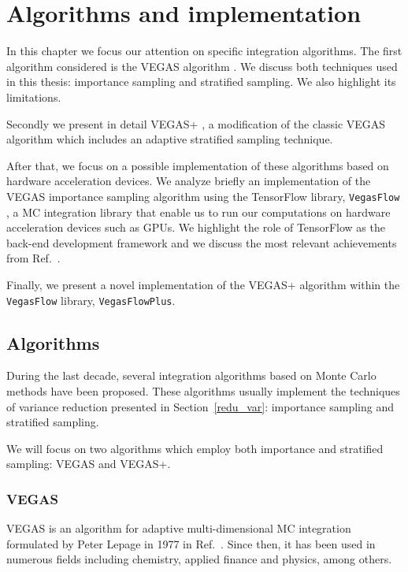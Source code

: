 \documentclass[../main/main.tex]{subfiles}
\begin{document}
\chapter[Algorithms and implementation]{Algorithms and implementation}
In this chapter we focus our attention on specific integration algorithms. 
The first algorithm considered is the VEGAS algorithm \cite{Lepage:1977sw}. We discuss both techniques used in this thesis: importance sampling and stratified sampling. We also highlight its limitations.

Secondly we present in detail VEGAS+ \cite{Lepage:2020tgj}, a modification of the classic VEGAS algorithm which includes an adaptive stratified sampling technique.

After that, we focus on a possible implementation of these algorithms based on hardware acceleration devices.
We analyze briefly an implementation of the VEGAS importance sampling algorithm using the TensorFlow library, \texttt{VegasFlow} \cite{vegasflow_package}, a MC integration library that enable us to run our computations on hardware acceleration devices such as GPUs. We highlight the role of TensorFlow as the back-end development framework and we discuss the most relevant achievements from Ref.~\cite{Carrazza:2020rdn}.

Finally, we present a novel implementation of the VEGAS+ algorithm within the \texttt{VegasFlow} library, \texttt{VegasFlowPlus}.

 
	
\section{Algorithms}
During the last decade, several integration algorithms based on Monte Carlo methods have been proposed.
These algorithms usually implement the techniques of variance reduction presented in Section~\ref{redu_var}: importance sampling and stratified sampling.

We will focus on two algorithms which employ both importance and stratified sampling: VEGAS and VEGAS+.

\subsection{VEGAS}
\label{vegas}
VEGAS is an algorithm for adaptive multi-dimensional MC integration formulated by Peter Lepage in 1977 in Ref.~\cite{Lepage:1977sw}.
Since then, it has been used in numerous fields including chemistry, applied finance and physics, among others.
\end{document}
